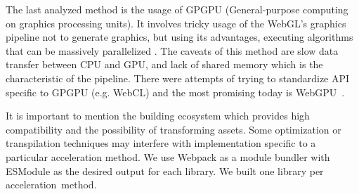 The last analyzed method is the usage of GPGPU (General-purpose computing on graphics processing units). It involves tricky usage of the WebGL's graphics pipeline not to generate graphics, but using its advantages, executing algorithms that can be massively parallelized \cite{sapuan2018general}. The caveats of this method are slow data transfer between CPU and GPU, and lack of shared memory which is the characteristic of the pipeline. There were attempts of trying to standardize API specific to GPGPU (e.g. WebCL) and the most promising today is WebGPU~\cite{webgpu_2022}.

It is important to mention the building ecosystem which provides high compatibility and the possibility of transforming assets. Some optimization or transpilation techniques may interfere with implementation specific to a particular acceleration method. We use Webpack as a module bundler with ESModule \cite{PALTOGLOU2021111049} as the desired output for each library. We built one library per acceleration~method.
